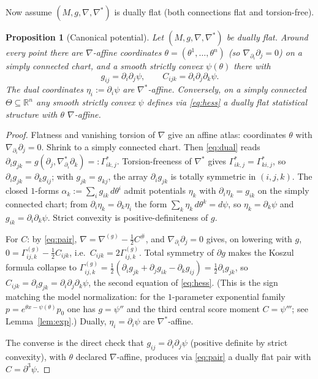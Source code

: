 \documentclass{amsart}
\newtheorem{proposition}{Proposition}
\theoremstyle{definition}
\theoremstyle{remark}
\begin{document}
Now assume $(M,g,\nabla,\nabla^{*})$ is dually flat (both connections flat and
torsion-free).

\begin{proposition}[Canonical potential]\label{prop:hessian}
Let $(M,g,\nabla,\nabla^{*})$ be dually flat. Around every point there are
$\nabla$-affine coordinates $\theta=(\theta^{1},\dots,\theta^{n})$ (so
$\nabla_{\partial_{i}}\partial_{j}=0$) on a simply connected chart, and a smooth
strictly convex $\psi(\theta)$ there with
\begin{equation}\label{eq:hess}
  g_{ij}=\partial_{i}\partial_{j}\psi,\qquad
  C_{ijk}=\partial_{i}\partial_{j}\partial_{k}\psi .
\end{equation}
The dual coordinates $\eta_{i}:=\partial_{i}\psi$ are $\nabla^{*}$-affine.
Conversely, on a simply connected $\Theta\subseteq\mathbb R^{n}$ any smooth
strictly convex $\psi$ defines via \eqref{eq:hess} a dually flat statistical
structure with $\theta$ $\nabla$-affine.
\end{proposition}

\begin{proof}
Flatness and vanishing torsion of $\nabla$ give an affine atlas: coordinates
$\theta$ with $\nabla_{\partial_{i}}\partial_{j}=0$. Shrink to a simply connected
chart. Then \eqref{eq:dual} reads
$\partial_{i}g_{jk}=g(\partial_{j},\nabla^{*}_{\partial_{i}}\partial_{k})
=:\Gamma^{*}_{ik,j}$. Torsion-freeness of $\nabla^{*}$ gives
$\Gamma^{*}_{ik,j}=\Gamma^{*}_{ki,j}$, so $\partial_{i}g_{jk}=\partial_{k}g_{ij}$;
with $g_{jk}=g_{kj}$, the array $\partial_{i}g_{jk}$ is totally symmetric in
$(i,j,k)$. The closed $1$-forms $\alpha_{k}:=\sum_{i}g_{ik}\,d\theta^{i}$ admit
potentials $\eta_{k}$ with $\partial_{i}\eta_{k}=g_{ik}$ on the simply connected
chart; from $\partial_{i}\eta_{k}=\partial_{k}\eta_{i}$ the form
$\sum_{k}\eta_{k}\,d\theta^{k}=d\psi$, so $\eta_{k}=\partial_{k}\psi$ and
$g_{ik}=\partial_{i}\partial_{k}\psi$. Strict convexity is positive-definiteness
of $g$.

For $C$: by \eqref{eq:pair}, $\nabla=\nabla^{(g)}-\tfrac12 C^{\#}$, and
$\nabla_{\partial_{i}}\partial_{j}=0$ gives, on lowering with $g$,
$0=\Gamma^{(g)}_{ij,k}-\tfrac12 C_{ijk}$, i.e.\ $C_{ijk}=2\Gamma^{(g)}_{ij,k}$.
Total symmetry of $\partial g$ makes the Koszul formula collapse to
$\Gamma^{(g)}_{ij,k}=\tfrac12(\partial_{i}g_{jk}+\partial_{j}g_{ik}
-\partial_{k}g_{ij})=\tfrac12\partial_{i}g_{jk}$, so
$C_{ijk}=\partial_{i}g_{jk}=\partial_{i}\partial_{j}\partial_{k}\psi$, the second
equation of \eqref{eq:hess}. (This is the sign matching the model normalization:
for the $1$-parameter exponential family $p=e^{\theta x-\psi(\theta)}p_{0}$ one
has $g=\psi''$ and the third central score moment $C=\psi'''$; see
Lemma~\ref{lem:exp}.) Dually, $\eta_{i}=\partial_{i}\psi$ are $\nabla^{*}$-affine.

The converse is the direct check that $g_{ij}=\partial_{i}\partial_{j}\psi$
(positive definite by strict convexity), with $\theta$ declared $\nabla$-affine,
produces via \eqref{eq:pair} a dually flat pair with $C=\partial^{3}\psi$.
\end{proof}
\end{document}
